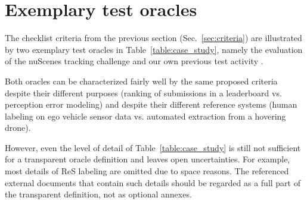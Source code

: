 \documentclass[conference]{IEEEtran}
\begin{document}





\section{Exemplary test oracles}
\label{sec:case_studies}


The checklist criteria from the previous section (Sec.~\ref{sec:criteria}) are illustrated by two exemplary test oracles in Table~\ref{table:case_study}, namely the evaluation of the nuScenes tracking challenge \cite{caesar2019nuscenes} and our own previous test activity \cite{Krajewski2020UsingDrones}. 


Both oracles can be characterized fairly well by the same proposed criteria despite their different purposes (ranking of submissions in a leaderboard vs. perception error modeling) and despite their different reference systems (human labeling on ego vehicle sensor data vs. automated extraction from a hovering drone).


However, even the level of detail of Table~\ref{table:case_study} is still not sufficient for a transparent oracle definition and leaves open uncertainties. %
For example, most details of ReS labeling are omitted due to space reasons. 
The referenced external documents that 
contain such details should be regarded as a full part of the transparent definition, not as optional annexes.
\end{document}
